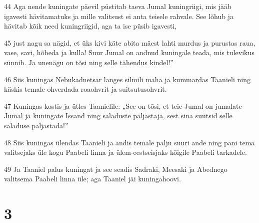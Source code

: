 \par 44 Aga nende kuningate päevil püstitab taeva Jumal kuningriigi, mis jääb igavesti hävitamatuks ja mille valitsust ei anta teisele rahvale. See lõhub ja hävitab kõik need kuningriigid, aga ta ise püsib igavesti,
\par 45 just nagu sa nägid, et üks kivi käte abita mäest lahti murdus ja purustas raua, vase, savi, hõbeda ja kulla! Suur Jumal on andnud kuningale teada, mis tulevikus sünnib. Ja unenägu on tõsi ning selle tähendus kindel!”
\par 46 Siis kuningas Nebukadnetsar langes silmili maha ja kummardas Taanieli ning käskis temale ohverdada roaohvrit ja suitsutusohvrit.
\par 47 Kuningas kostis ja ütles Taanielile: „See on tõsi, et teie Jumal on jumalate Jumal ja kuningate Issand ning saladuste paljastaja, sest sina suutsid selle saladuse paljastada!”
\par 48 Siis kuningas ülendas Taanieli ja andis temale palju suuri ande ning pani tema valitsejaks üle kogu Paabeli linna ja ülem-eestseisjaks kõigile Paabeli tarkadele.
\par 49 Ja Taaniel palus kuningat ja see seadis Sadraki, Meesaki ja Abednego valitsema Paabeli linna üle; aga Taaniel jäi kuningahoovi.

\chapter{3}

